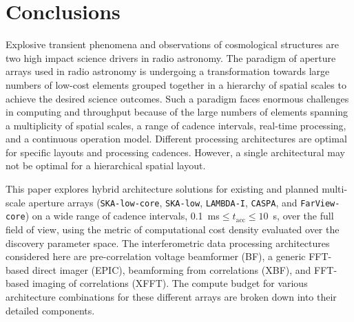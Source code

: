 \documentclass[
  journal=pasa,
  manuscript=article-type,
  year=2020,
  volume=37,
]{cup-journal}
\begin{document}






\section{Conclusions} \label{sec:conclusion}

Explosive transient phenomena and observations of cosmological structures are two high impact science drivers in radio astronomy. The paradigm of aperture arrays used in radio astronomy is undergoing a transformation towards large numbers of low-cost elements grouped together in a hierarchy of spatial scales to achieve the desired science outcomes. Such a paradigm faces enormous challenges in computing and throughput because of the large numbers of elements spanning a multiplicity of spatial scales, a range of cadence intervals, real-time processing, and a continuous operation model. Different processing architectures are optimal for specific layouts and processing cadences. However, a single architectural may not be optimal for a hierarchical spatial layout.

This paper explores hybrid architecture solutions for existing and planned multi-scale aperture arrays (\texttt{SKA-low-core}, \texttt{SKA-low}, \texttt{LAMBDA-I}, \texttt{CASPA}, and \texttt{FarView-core}) on a wide range of cadence intervals, 0.1~ms$\le t_\textrm{acc} \le 10$~s, over the full field of view, using the metric of computational cost density evaluated over the discovery parameter space. The interferometric data processing architectures considered here are pre-correlation voltage beamformer (BF), a generic FFT-based direct imager (EPIC), beamforming from correlations (XBF), and FFT-based imaging of correlations (XFFT). The compute budget for various architecture combinations for these different arrays are broken down into their detailed components. 
\end{document}
